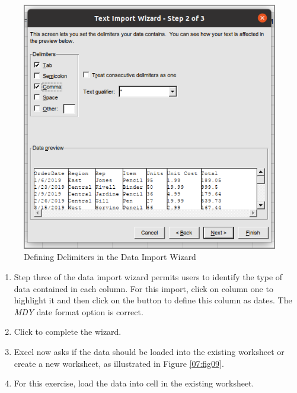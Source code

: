 \begin{figure}[H]
	\centering
	\includegraphics[width=\maxwidth{.95\linewidth}]{gfx/ch07_fig08}
	\caption{Defining Delimiters in the Data Import Wizard}
	\label{07:fig08}
\end{figure}

\begin{enumerate}
	\item Step three of the data import wizard permits users to identify the type of data contained in each column. For this import, click on column one to highlight it and then click on the  button to define this column as dates. The \textit{MDY} date format option is correct.
	\item Click  to complete the wizard.
	\item Excel now asks if the data should be loaded into the existing worksheet or create a new worksheet, as illustrated in Figure \ref{07:fig09}.
	\item For this exercise, load the data into cell  in the existing worksheet.
\end{enumerate}

